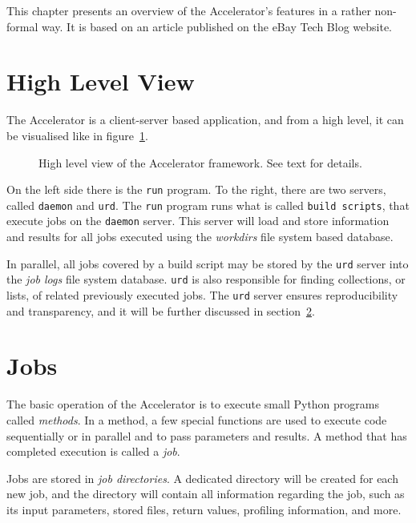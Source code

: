 
This chapter presents an overview of the Accelerator's features in a
rather non-formal way.  It is based on an article published on the
eBay Tech Blog website.



\section{High Level View}
The Accelerator is a client-server based application, and from a high
level, it can be visualised like in figure~\ref{fig:overview}.
\begin{figure}[h!]
  \begin{center}
    
    \caption{High level view of the Accelerator framework.  See text
      for details.}
    \label{fig:overview}
  \end{center}
\end{figure}

On the left side there is the \texttt{run} program.  To the right, there
are two servers, called \texttt{daemon} and \texttt{urd}.  The
\texttt{run} program runs what is called \texttt{build scripts}, that
execute jobs on the \texttt{daemon} server.  This server will load and
store information and results for all jobs executed using the
\textsl{workdirs} file system based database.

In parallel, all jobs covered by a build script may be stored by the
\texttt{urd} server into the \textsl{job logs} file system database.
\texttt{urd} is also responsible for finding collections, or lists, of
related previously executed jobs.  The \texttt{urd} server ensures
reproducibility and transparency, and it will be further discussed in
section~\ref{}.



\section{Jobs}
The basic operation of the Accelerator is to execute small Python
programs called \textsl{methods}.  In a method, a few special
functions are used to execute code sequentially or in parallel and to
pass parameters and results.  A method that has completed execution is
called a \textsl{job}.

Jobs are stored in \textsl{job directories}.  A dedicated directory
will be created for each new job, and the directory will contain all
information regarding the job, such as its input parameters, stored
files, return values, profiling information, and more.

